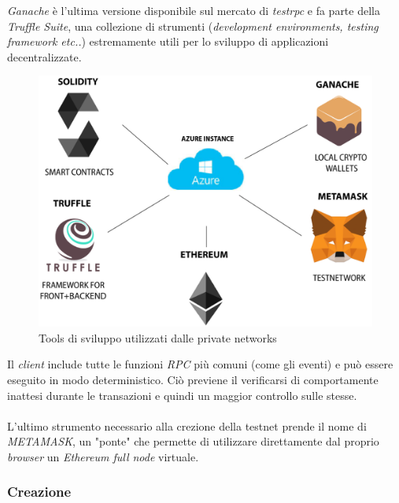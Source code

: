 \documentclass[11pt]{thesistemp}
\begin{document}
\textit{Ganache} è l'ultima versione disponibile sul mercato di \textit{testrpc} e fa parte della \textit{Truffle Suite}, una collezione di strumenti (\textit{development environments, testing framework etc..}) estremamente utili per lo sviluppo di applicazioni decentralizzate.\\
\begin{figure}[h]
    \centering
    \includegraphics[scale=0.275]{eth-dev-test.png}
        \caption{Tools di sviluppo utilizzati dalle private networks}
    \label{fig:eth-dev-test}
\end{figure}
\linebreak
Il \textit{client} include tutte le funzioni \textit{RPC} più comuni (come gli eventi) e può essere eseguito in modo deterministico. Ciò previene il verificarsi di comportamente inattesi durante le transazioni e quindi un maggior controllo sulle stesse.\\\\

L'ultimo strumento necessario alla crezione della testnet prende il nome di \textit{METAMASK}, un "ponte" che permette di utilizzare direttamente dal proprio \textit{browser} un \textit{Ethereum full node} virtuale.

\subsubsection{Creazione}
\end{document}
